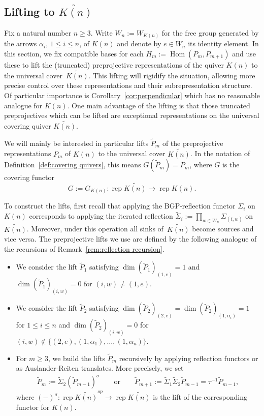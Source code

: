 \documentclass{amsart}
\numberwithin{equation}{section}
\newcommand{\rep}{\operatorname{rep}}
\newcommand{\Hom}{\operatorname{Hom}}
\begin{document}
\subsection{Lifting to $\widetilde{K(n)}$}
\label{Lifting}

Fix a natural number $n\geq 3$.
Write $W_n:=W_{K(n)}$ for the free group generated by the arrows $\alpha_i$, $1\le i\le n$, of $K(n)$ and denote by $e\in W_n$ its identity element.
In this section, we fix compatible bases for each $H_m:=\Hom(P_m,P_{m+1})$ and use these to lift the (truncated) preprojective representations of the quiver $K(n)$ to the universal cover~$\widetilde{K(n)}$.
This lifting will rigidify the situation, allowing more precise control over these representations and their subrepresentation structure.
Of particular importance is Corollary~\ref{cor:perpendicular} which has no reasonable analogue for $K(n)$.
One main advantage of the lifting is that those truncated preprojectives which can be lifted are exceptional representations on the universal covering quiver $\widetilde{K(n)}$.

We will mainly be interested in particular lifts $\tilde P_m$ of the preprojective representations $P_m$ of $K(n)$ to the universal cover $\widetilde{K(n)}$.
In the notation of Definition~\ref{def:covering quivers}, this means $G(\tilde P_m)=P_m$, where $G$ is the covering functor 
\[G:=G_{K(n)}:\rep\widetilde{K(n)}\to\rep K(n).\]

To construct the lifts, first recall that applying the BGP-reflection functor $\Sigma_i$ on $K(n)$ corresponds to applying the iterated reflection $\tilde\Sigma_i:=\prod_{w\in W_n}\Sigma_{(i,w)}$ on $\widetilde{K(n)}$.
Moreover, under this operation all sinks of~$\widetilde{K(n)}$ become sources and vice versa.
The preprojective lifts we use are defined by the following analogue of the recursions of Remark~\ref{rem:reflection recursion}.
\begin{itemize}
  \item We consider the lift $\tilde P_1$ satisfying $\dim(\tilde P_1)_{(1,e)}=1$ and $\dim (\tilde P_1)_{(i,w)}=0$ for $(i,w)\neq (1,e)$.
  \item We consider the lift $\tilde P_2$ satisfying $\dim (\tilde P_2)_{(2,e)}=\dim (\tilde P_2)_{(1,\alpha_i)}=1$ for $1\le i\le n$ and $\dim(\tilde P_2)_{(i,w)}=0$ for $(i,w)\notin\{(2,e),(1,\alpha_1),\ldots,(1,\alpha_n)\}$.
  \item For $m\geq 3$, we build the lifts $\tilde P_m$ recursively by applying reflection functors or as Auslander-Reiten translates.
    More precisely, we set
    \begin{align}
      \label{eq:recursive covers}
      \tilde P_m:=\tilde\Sigma_2(\tilde P_{m-1})^{\sigma}\qquad\text{or}\qquad\tilde P_{m+1}:=\tilde\Sigma_{1}\tilde\Sigma_2\tilde P_{m-1}=\tau^{-1} \tilde P_{m-1},
    \end{align}
    where $(-)^\sigma:\rep\widetilde{K(n)}^{op}\to\rep\widetilde{K(n)}$ is the lift of the corresponding functor for $K(n)$.
\end{itemize}
\end{document}

